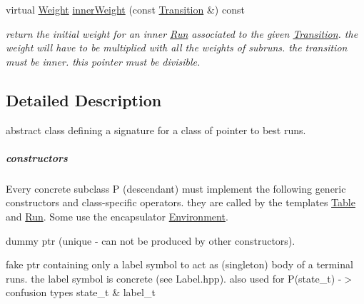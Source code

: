 \begin{DoxyCompactItemize}
virtual \mbox{\hyperlink{classWeight}{Weight}} \mbox{\hyperlink{group__table_gad709430d698804267807f12deba9952b}{inner\+Weight}} (const \mbox{\hyperlink{classTransition}{Transition}} \&) const
\begin{DoxyCompactList}\small\item\em return the initial weight for an inner \mbox{\hyperlink{classRun}{Run}} associated to the given \mbox{\hyperlink{classTransition}{Transition}}. the weight will have to be multiplied with all the weights of subruns. the transition must be inner. this pointer must be divisible. \end{DoxyCompactList}\end{DoxyCompactItemize}


\subsection{Detailed Description}
abstract class defining a signature for a class of pointer to best runs. 

\subparagraph*{constructors}

Every concrete subclass P (descendant) must implement the following generic constructors and class-\/specific operators. they are called by the templates \mbox{\hyperlink{classTable}{Table}} and \mbox{\hyperlink{classRun}{Run}}. Some use the encapsulator \mbox{\hyperlink{classEnvironment}{Environment}}.


\begin{DoxyCode}{0}
\end{DoxyCode}
 dummy ptr (unique -\/ can not be produced by other constructors).


\begin{DoxyCode}{0}
\end{DoxyCode}
 fake ptr containing only a label symbol to act as (singleton) body of a terminal runs. the label symbol is concrete (see Label.\+hpp). also used for P(state\+\_\+t) -\/$>$ confusion types state\+\_\+t \& label\+\_\+t


